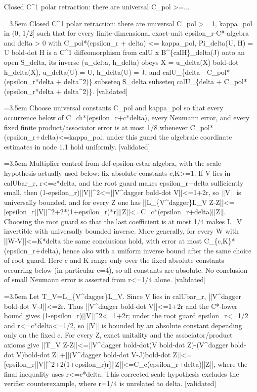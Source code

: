 \documentclass{article}
\newcommand{\step}[1]{\par\noindent\hangindent=3.5em\hangafter=1%
  \makebox[3.5em][l]{\textbf{#1.}}}
\newcommand{\steptag}[1]{\hfill{\small\textsf{[#1]}}}
\begin{document}
\begin{proofbox}{Closed C\textasciicircum{}1 polar retraction: there are universal C\_pol >=...}
\step{1} Closed C\textasciicircum{}1 polar retraction: there are universal C\_pol >= 1, kappa\_pol in (0, 1/2] such that for every finite-dimensional exact-unit epsilon\_r-C*-algebra and delta > 0 with C\_pol*(epsilon\_r + delta) <= kappa\_pol, Pi\_delta(U, H) = U bold-dot H is a C\textasciicircum{}1 diffeomorphism from calU x B\textasciicircum{}\{calH\}\_delta(J) onto an open S\_delta, its inverse (u\_delta, h\_delta) obeys X = u\_delta(X) bold-dot h\_delta(X), u\_delta(U) = U, h\_delta(U) = J, and calU\_\{delta - C\_pol*(epsilon\_r*delta + delta\textasciicircum{}2)\} subseteq S\_delta subseteq calU\_\{delta + C\_pol*(epsilon\_r*delta + delta\textasciicircum{}2)\}. \steptag{validated} \\[6pt]
\step{1.1} Choose universal constants C\_pol and kappa\_pol so that every occurrence below of C\_ch*(epsilon\_r+c*delta), every Neumann error, and every fixed finite product/associator error is at most 1/8 whenever C\_pol*(epsilon\_r+delta)<=kappa\_pol; under this guard the algebraic coordinate estimates in node 1.1 hold uniformly. \steptag{validated} \\[6pt]
\step{1.1.1} Multiplier control from def-epsilon-cstar-algebra, with the scale hypothesis actually used below: fix absolute constants c,K>=1. If V lies in calUbar\_r, r<=c*delta, and the root guard makes epsilon\_r+delta sufficiently small, then (1-epsilon\_r)||V||\textasciicircum{}2<=||V\textasciicircum{}dagger bold-dot V||<=1+2r, so ||V|| is universally bounded, and for every Z one has ||L\_\{V\textasciicircum{}dagger\}L\_V Z-Z||<=[epsilon\_r||V||\textasciicircum{}2+2*(1+epsilon\_r)*r]||Z||<=C\_c*(epsilon\_r+delta)||Z||. Choosing the root guard so that the last coefficient is at most 1/4 makes L\_V invertible with universally bounded inverse. More generally, for every W with ||W-V||<=K*delta the same conclusions hold, with error at most C\_\{c,K\}*(epsilon\_r+delta), hence also with a uniform inverse bound after the same choice of root guard. Here c and K range only over the fixed absolute constants occurring below (in particular c=4), so all constants are absolute. No conclusion of small Neumann error is asserted from r<=1/4 alone. \steptag{validated} \\[6pt]
\step{1.1.1.1} Let T\_V=L\_\{V\textasciicircum{}dagger\}L\_V. Since V lies in calUbar\_r, ||V\textasciicircum{}dagger bold-dot V-J||<=2r. Thus ||V\textasciicircum{}dagger bold-dot V||<=1+2r and the C*-lower bound gives (1-epsilon\_r)||V||\textasciicircum{}2<=1+2r; under the root guard epsilon\_r<=1/2 and r<=c*delta<=1/2, so ||V|| is bounded by an absolute constant depending only on the fixed c. For every Z, exact unitality and the associator/product axioms give ||T\_V Z-Z||<=||V\textasciicircum{}dagger bold-dot(V bold-dot Z)-(V\textasciicircum{}dagger bold-dot V)bold-dot Z||+||(V\textasciicircum{}dagger bold-dot V-J)bold-dot Z||<=[epsilon\_r||V||\textasciicircum{}2+2(1+epsilon\_r)r]||Z||<=C\_c(epsilon\_r+delta)||Z||, where the final inequality uses r<=c*delta. This corrected scale hypothesis excludes the verifier counterexample, where r=1/4 is unrelated to delta. \steptag{validated} \\[4pt]

\end{proofbox}
\end{document}
